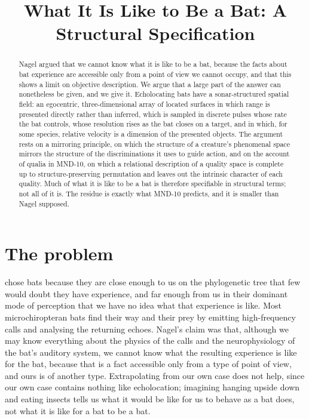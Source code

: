 \documentclass{situationist-preprint}
\title{What It Is Like to Be a Bat: A Structural Specification}
\begin{document}
\maketitle

\begin{abstract}
Nagel argued that we cannot know what it is like to be a bat, because the facts about bat experience are accessible only from a point of view we cannot occupy, and that this shows a limit on objective description. We argue that a large part of the answer can nonetheless be given, and we give it. Echolocating bats have a sonar-structured spatial field: an egocentric, three-dimensional array of located surfaces in which range is presented directly rather than inferred, which is sampled in discrete pulses whose rate the bat controls, whose resolution rises as the bat closes on a target, and in which, for some species, relative velocity is a dimension of the presented objects. The argument rests on a mirroring principle, on which the structure of a creature's phenomenal space mirrors the structure of the discriminations it uses to guide action, and on the account of qualia in MND-10, on which a relational description of a quality space is complete up to structure-preserving permutation and leaves out the intrinsic character of each quality. Much of what it is like to be a bat is therefore specifiable in structural terms; not all of it is. The residue is exactly what MND-10 predicts, and it is smaller than Nagel supposed.
\end{abstract}

\section{The problem}\label{s:problem}

\citet{Nagel1974} chose bats because they are close enough to us on the phylogenetic tree that few would doubt they have experience, and far enough from us in their dominant mode of perception that we have no idea what that experience is like. Most microchiropteran bats find their way and their prey by emitting high-frequency calls and analysing the returning echoes. Nagel's claim was that, although we may know everything about the physics of the calls and the neurophysiology of the bat's auditory system, we cannot know what the resulting experience is like for the bat, because that is a fact accessible only from a type of point of view, and ours is of another type. Extrapolating from our own case does not help, since our own case contains nothing like echolocation; imagining hanging upside down and eating insects tells us what it would be like for us to behave as a bat does, not what it is like for a bat to be a bat.
\end{document}

